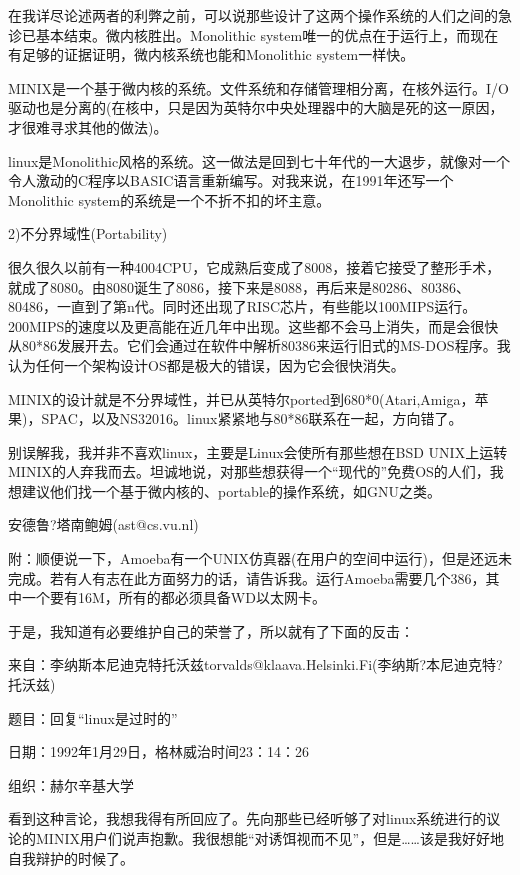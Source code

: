 在我详尽论述两者的利弊之前，可以说那些设计了这两个操作系统的人们之间的急诊已基本结束。微内核胜出。Monolithic system唯一的优点在于运行上，而现在有足够的证据证明，微内核系统也能和Monolithic system一样快。

MINIX是一个基于微内核的系统。文件系统和存储管理相分离，在核外运行。I/O驱动也是分离的(在核中，只是因为英特尔中央处理器中的大脑是死的这一原因，才很难寻求其他的做法)。

linux是Monolithic风格的系统。这一做法是回到七十年代的一大退步，就像对一个令人激动的C程序以BASIC语言重新编写。对我来说，在1991年还写一个Monolithic system的系统是一个不折不扣的坏主意。

2)不分界域性(Portability)

很久很久以前有一种4004CPU，它成熟后变成了8008，接着它接受了整形手术，就成了8080。由8080诞生了8086，接下来是8088，再后来是80286、80386、80486，一直到了第n代。同时还出现了RISC芯片，有些能以100MIPS运行。200MIPS的速度以及更高能在近几年中出现。这些都不会马上消失，而是会很快从80*86发展开去。它们会通过在软件中解析80386来运行旧式的MS-DOS程序。我认为任何一个架构设计OS都是极大的错误，因为它会很快消失。

MINIX的设计就是不分界域性，并已从英特尔ported到680*0(Atari,Amiga，苹果)，SPAC，以及NS32016。linux紧紧地与80*86联系在一起，方向错了。

别误解我，我并非不喜欢linux，主要是Linux会使所有那些想在BSD UNIX上运转MINIX的人弃我而去。坦诚地说，对那些想获得一个“现代的”免费OS的人们，我想建议他们找一个基于微内核的、portable的操作系统，如GNU之类。

 

安德鲁?塔南鲍姆(ast@cs.vu.nl)

 

附：顺便说一下，Amoeba有一个UNIX仿真器(在用户的空间中运行)，但是还远未完成。若有人有志在此方面努力的话，请告诉我。运行Amoeba需要几个386，其中一个要有16M，所有的都必须具备WD以太网卡。

 

于是，我知道有必要维护自己的荣誉了，所以就有了下面的反击：

 

来自：李纳斯本尼迪克特托沃兹torvalds@klaava.Helsinki.Fi(李纳斯?本尼迪克特?托沃兹)

题目：回复“linux是过时的”

日期：1992年1月29日，格林威治时间23：14：26

组织：赫尔辛基大学

 

看到这种言论，我想我得有所回应了。先向那些已经听够了对linux系统进行的议论的MINIX用户们说声抱歉。我很想能“对诱饵视而不见”，但是……该是我好好地自我辩护的时候了。

